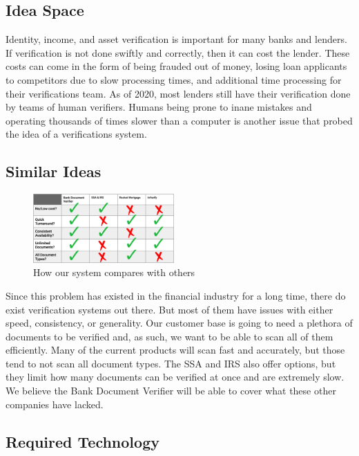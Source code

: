 \subsection{Idea Space}

Identity, income, and asset verification is important for many banks and lenders. If verification is not done swiftly and correctly, then it can cost the lender. These costs can come in the form of being frauded out of money, losing loan applicants to competitors due to slow processing times, and additional time processing for their verifications team. As of 2020, most lenders still have their verification done by teams of human verifiers. Humans being prone to inane mistakes and operating thousands of times slower than a computer is another issue that probed the idea of a verifications system.

\subsection{Similar Ideas}

\begin{figure}
    \centering
    \includegraphics[width=0.48\textwidth]{assets/comparison-table.png}
    \caption{How our system compares with others}
\end{figure}

Since this problem has existed in the financial industry for a long time, there do exist verification systems out there. But most of them have issues with either speed, consistency, or generality. Our customer base is going to need a plethora of documents to be verified and, as such, we want to be able to scan all of them efficiently. Many of the current products will scan fast and accurately, but those tend to not scan all document types. The SSA and IRS also offer options, but they limit how many documents can be verified at once and are extremely slow. We believe the Bank Document Verifier will be able to cover what these other companies have lacked.

\subsection{Required Technology}

